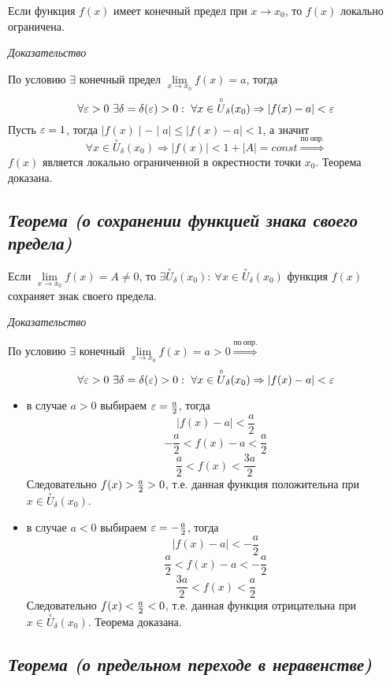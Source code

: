 Если функция $f(x)$ имеет конечный предел при $x \rightarrow x_0$, то $f(x)$ локально ограничена.

\textit{Доказательство}

По условию $\exists$ конечный предел $\lim\limits_{x \to x_0}f(x) = a$, тогда $$\forall {\large\varepsilon} > 0 \ \exists\delta=\delta({\large\varepsilon} )>0: \ \forall x \in \overset{\circ}U_\delta(x_0) \Rightarrow | f(x) - a|  < {\large\varepsilon}$$ Пусть ${\large\varepsilon} = 1$, тогда $\mid  f(x)\mid   - \mid  a\mid   \leqslant \mid  f(x) - a\mid   < 1$, а значит $$\forall x \in \overset{\circ}U_\delta(x_0) \Rightarrow | f(x)|  <1 + | A|  = const \overset{по\ опр.}{\Rightarrow}$$ $f(x)$ является локально ограниченной в окрестности точки $x_0$. Теорема доказана.
\subsection{\textit{Теорема (о сохранении функцией знака своего предела)}}

Если $\lim\limits_{x \to x_0} f(x) = A \neq 0$, то $\exists \overset{\circ}U_\delta(x_0): \ \forall x \in \overset{\circ}U_\delta(x_0)$ функция $f(x)$ сохраняет знак своего предела.

\textit{Доказательство}

По условию $\exists$ конечный $\lim\limits_{x \to x_0} f(x) = a > 0 \overset{по\ опр.}{\Rightarrow}$ $$\forall {\large\varepsilon} > 0 \ \exists\delta=\delta({\large\varepsilon} )>0: \ \forall x \in \overset{\circ}U_\delta(x_0) \Rightarrow | f(x) - a|  < {\large\varepsilon}$$
\begin{itemize}

\item в случае $a > 0$ выбираем ${\large\varepsilon} = {\Large\frac{a}{2}}$, тогда $$| f(x) - a|  < {\frac{a}{2}}$$ $$-{\frac{a}{2}}< f(x) - a < {\frac{a}{2}}$$ $${\frac{a}{2}}< f(x) < {\frac{3a}{2}}$$ Следовательно $f(x) > {\Large\frac{a}{2}}>0$, т.е. данная функция положительна при $x \in \overset{\circ}U_\delta(x_0)$.
\item в случае $a < 0$ выбираем ${\large\varepsilon} = -{\Large\frac{a}{2}}$, тогда $$| f(x) - a|  < - {\frac{a}{2}}$$ $${\frac{a}{2}}< f(x) - a < -{\frac{a}{2}}$$ $${\frac{3a}{2}}< f(x) < {\frac{a}{2}}$$ Следовательно $f(x) < {\Large\frac{a}{2}}< 0$, т.е. данная функция отрицательна при $x \in \overset{\circ}U_\delta(x_0)$. Теорема доказана.

\end{itemize}
\subsection{\textit{Теорема (о предельном переходе в неравенстве)}}

